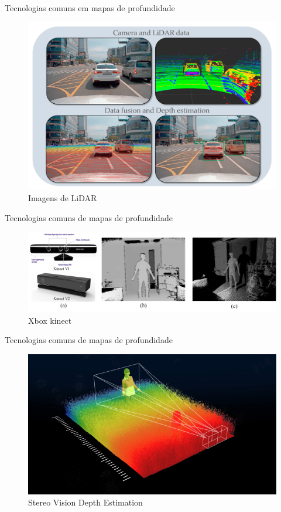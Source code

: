 \documentclass[aspectratio=169]{beamer}
\begin{document}
\begin{frame}{Tecnologias comuns em mapas de profundidade}
    \begin{figure}
        \centering
        \includegraphics[scale=.1]{figs/lidar.png}
        \caption{Imagens de LiDAR}
        \label{fig:enter-label}
    \end{figure}
\end{frame}

\begin{frame}{Tecnologias comuns de mapas de profundidade}
    \begin{figure}
        \centering
        \includegraphics[width=\textwidth]{figs/a-Kinect-sensors-8-9-b-The-25D-depth-map-captured-by-Kinect-V2-c-The.png}
        \caption{Xbox kinect}
        \label{fig:enter-label}
    \end{figure}
\end{frame}

\begin{frame}{Tecnologias comuns de mapas de profundidade}
    \begin{figure}
        \centering
        \includegraphics[width=.7\textwidth]{figs/CP_DM_SI_CR.png}
        \caption{Stereo Vision Depth Estimation}
        \label{fig:enter-label}
    \end{figure}
\end{frame}
\end{document}
